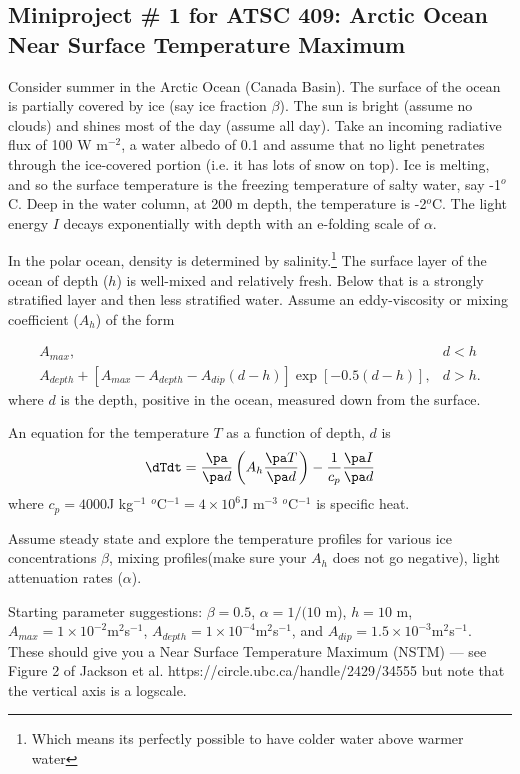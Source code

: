\documentclass[12pt]{article}
\begin{document}
\subsection*{Miniproject \# 1 for ATSC 409: Arctic Ocean Near Surface Temperature Maximum}

Consider summer in the Arctic Ocean (Canada Basin).  The surface of
the ocean is partially covered by ice (say ice fraction $\beta$).  The sun
is bright (assume no clouds) and shines most of the day (assume all
day).  Take an incoming radiative flux of 100 W m$^{-2}$, a water albedo of
0.1 and assume that no light penetrates through the ice-covered portion
(i.e. it has lots of snow on top).  Ice is melting, and so the surface
temperature is the freezing temperature of salty water, say
-1$^o$C. Deep in the water column, at 200 m depth, the temperature is
-2$^o$C.  The light energy $I$ decays exponentially with depth with an
e-folding scale of $\alpha$.

In the polar ocean, density is determined by salinity.\footnote{Which
  means its perfectly possible to have colder water above warmer
  water} The surface layer of the ocean of depth ($h$) is well-mixed
and relatively fresh.  Below that is a strongly stratified layer and
then less stratified water.  Assume an eddy-viscosity or mixing
coefficient ($A_h$) of the form

\begin{eqnarray}
 A_{max}, & d < h \\
A_{depth} + \left[A_{max}-A_{depth}-A_{dip}(d-h)\right] \exp \left[-0.5(d-h)\right], & d > h.
\end{eqnarray}
where $d$ is the depth, positive in the ocean, measured down from the surface.

An equation for the temperature $T$ as a function of depth, $d$ is
\begin{equation}
\dTdt = \frac {\pa}{\pa d} \left(A_h \frac {\pa T}{\pa d} \right) - \frac 1 {c_p} \frac {\pa I}{\pa d}
\end{equation}
where $c_p = 4000$J kg$^{-1}$ $^o$C$^{-1} = 4 \times 10^6$J m$^{-3}$ $^o$C$^{-1}$ is specific heat.

Assume steady state and explore the temperature profiles for various ice concentrations $\beta$, mixing profiles(make sure your $A_h$ does not go negative), light attenuation rates ($\alpha$).

Starting parameter suggestions: $\beta = 0.5$, $\alpha = 1/(10$ m), $h = 10$ m, $A_{max} = 1 \times 10^{-2} $m$^2$s$^{-1}$, $A_{depth} = 1 \times 10^{-4} $m$^2$s$^{-1}$, and $A_{dip} = 1.5 \times 10^{-3} $m$^2$s$^{-1}$.  These should give you a Near Surface Temperature Maximum (NSTM) --- see Figure 2 of Jackson et al. https://circle.ubc.ca/handle/2429/34555 but note that the vertical axis is a logscale.
\end{document}
